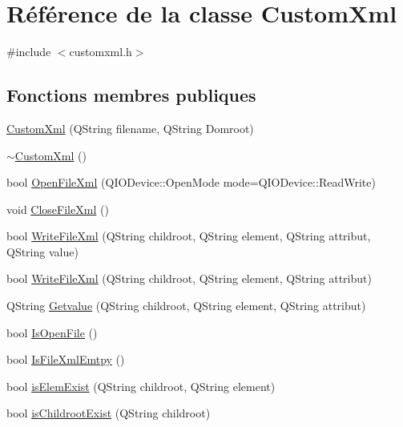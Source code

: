 \hypertarget{class_custom_xml}{}\section{Référence de la classe Custom\+Xml}
\label{class_custom_xml}


{\ttfamily \#include $<$customxml.\+h$>$}

\subsection*{Fonctions membres publiques}
\begin{DoxyCompactItemize}
\item 
\hyperlink{class_custom_xml_ae54a29e0d5409e42a04989b998dfd992}{Custom\+Xml} (Q\+String filename, Q\+String Domroot)
\item 
\hyperlink{class_custom_xml_ac503b393fa89c72700707aa7d3b357a5}{$\sim$\+Custom\+Xml} ()
\item 
bool \hyperlink{class_custom_xml_a3b6255c37ca74e822f70fae3c865a06a}{Open\+File\+Xml} (Q\+I\+O\+Device\+::\+Open\+Mode mode=Q\+I\+O\+Device\+::\+Read\+Write)
\item 
void \hyperlink{class_custom_xml_a0c83e9d625a87c5d04f3cba663615417}{Close\+File\+Xml} ()
\item 
bool \hyperlink{class_custom_xml_afaf0e16ed2a5722c035170cf19b25422}{Write\+File\+Xml} (Q\+String childroot, Q\+String element, Q\+String attribut, Q\+String value)
\item 
bool \hyperlink{class_custom_xml_a2fb2cf85206fbb372ed7db14110b06f5}{Write\+File\+Xml} (Q\+String childroot, Q\+String element, Q\+String attribut)
\item 
Q\+String \hyperlink{class_custom_xml_a2c3d337e8a7c3426ea84b87c6892b6a0}{Getvalue} (Q\+String childroot, Q\+String element, Q\+String attribut)
\item 
bool \hyperlink{class_custom_xml_a4601b3386cfe088199f9c148c495a1d5}{Is\+Open\+File} ()
\item 
bool \hyperlink{class_custom_xml_a81f597dc4acea93f97cc59757271e35d}{Is\+File\+Xml\+Emtpy} ()
\item 
bool \hyperlink{class_custom_xml_a079fb80ab167ecb292ae973346de8421}{is\+Elem\+Exist} (Q\+String childroot, Q\+String element)
\item 
bool \hyperlink{class_custom_xml_ad6d70785b6b86ee55c4e5e0d0871017b}{is\+Childroot\+Exist} (Q\+String childroot)
\end{DoxyCompactItemize}


